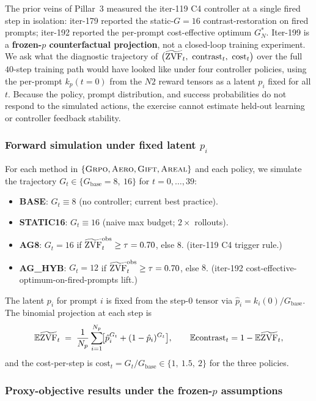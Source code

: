 \label{sec:p7-closed-loop-counterfactual}

The prior veins of Pillar~3 measured the iter-119 C4 controller at a single
fired step in isolation: iter-179 reported the static-$G=16$ contrast-restoration
on fired prompts; iter-192 reported the per-prompt cost-effective optimum
$G_N^*$. Iter-199 is a \textbf{frozen-$p$ counterfactual projection}, not a
closed-loop training experiment. We ask what the diagnostic trajectory of
$\bigl(\zvf_t,\ \mathrm{contrast}_t,\ \mathrm{cost}_t\bigr)$ over the full
$40$-step training path would have looked like under four controller policies,
using the per-prompt $k_p(t=0)$ from the $N2$ reward tensors as a latent
$p_i$ fixed for all $t$. Because the policy, prompt distribution, and success
probabilities do not respond to the simulated actions, the exercise cannot
estimate held-out learning or controller feedback stability.

\subsubsection*{Forward simulation under fixed latent $p_i$}

For each method in $\{\textsc{Grpo},\textsc{Aero},\textsc{Gift},\textsc{Areal}\}$ and
each policy, we simulate the trajectory $G_t \in \{G_{\text{base}}=8,\ 16\}$
for $t=0,\dots,39$:
\begin{itemize}
\item \textbf{BASE}: $G_t \equiv 8$ (no controller; current best practice).
\item \textbf{STATIC16}: $G_t \equiv 16$ (naive max budget; $2\times$ rollouts).
\item \textbf{AG8}: $G_t = 16$ if $\widetilde{\mathrm{ZVF}}_t^{\text{obs}} \geq \tau=0.70$, else $8$.
  (iter-119 C4 trigger rule.)
\item \textbf{AG\_HYB}: $G_t = 12$ if $\widetilde{\mathrm{ZVF}}_t^{\text{obs}} \geq \tau=0.70$, else $8$.
  (iter-192 cost-effective-optimum-on-fired-prompts lift.)
\end{itemize}
The latent $p_i$ for prompt $i$ is fixed from the step-$0$ tensor via
$\hat p_i = k_i(0) / G_{\text{base}}$. The binomial projection at each step is
\[
\mathbb{E}{\widetilde{\mathrm{ZVF}}}_t \;=\; \frac{1}{N_p}\sum_{i=1}^{N_p}\!\bigl[\hat p_i^{G_t}
+ (1-\hat p_i)^{G_t}\bigr],\qquad
\mathbb{E}{\mathrm{contrast}}_t = 1 - \mathbb{E}{\widetilde{\mathrm{ZVF}}}_t,
\]
and the cost-per-step is
$\mathrm{cost}_t = G_t / G_{\text{base}} \in \{1,\ 1.5,\ 2\}$ for the three
policies.

\subsubsection*{Proxy-objective results under the frozen-$p$ assumptions}

